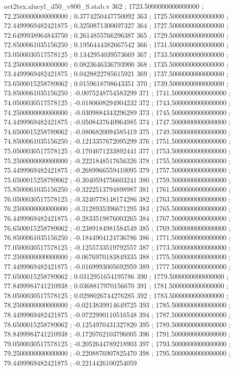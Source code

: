 \begin{filecontents}[overwrite]{oct2tex.alucyl_d50_v800_S.stab.v}
362 ; 1723.5000000000000000 ; 72.2500000000000000 ; 0.3774250447750092
363 ; 1725.5000000000000000 ; 72.4499969482421875 ; 0.3250871300697327
364 ; 1727.5000000000000000 ; 72.6499938964843750 ; 0.2614855766296387
365 ; 1729.5000000000000000 ; 72.8500061035156250 ; 0.1956444382667542
366 ; 1731.5000000000000000 ; 73.0500030517578125 ; 0.1342954039573669
367 ; 1733.5000000000000000 ; 73.2500000000000000 ; 0.0823646336793900
368 ; 1735.5000000000000000 ; 73.4499969482421875 ; 0.0428822785615921
369 ; 1737.5000000000000000 ; 73.6500015258789062 ; 0.0159618798643351
370 ; 1739.5000000000000000 ; 73.8500061035156250 ; -0.0075248754583299
371 ; 1741.5000000000000000 ; 74.0500030517578125 ; -0.0180608294904232
372 ; 1743.5000000000000000 ; 74.2500000000000000 ; -0.0309884343296289
373 ; 1745.5000000000000000 ; 74.4499969482421875 ; -0.0508437640964985
374 ; 1747.5000000000000000 ; 74.6500015258789062 ; -0.0806820094585419
375 ; 1749.5000000000000000 ; 74.8500061035156250 ; -0.1213357672095299
376 ; 1751.5000000000000000 ; 75.0500030517578125 ; -0.1704671233892441
377 ; 1753.5000000000000000 ; 75.2500000000000000 ; -0.2221848517656326
378 ; 1755.5000000000000000 ; 75.4499969482421875 ; -0.2689966559410095
379 ; 1757.5000000000000000 ; 75.6500015258789062 ; -0.3040594756603241
380 ; 1759.5000000000000000 ; 75.8500061035156250 ; -0.3222513794898987
381 ; 1761.5000000000000000 ; 76.0500030517578125 ; -0.3240778148174286
382 ; 1763.5000000000000000 ; 76.2500000000000000 ; -0.3128935396671295
383 ; 1765.5000000000000000 ; 76.4499969482421875 ; -0.2833519876003265
384 ; 1767.5000000000000000 ; 76.6500015258789062 ; -0.2389184981584549
385 ; 1769.5000000000000000 ; 76.8500061035156250 ; -0.1844904124736786
386 ; 1771.5000000000000000 ; 77.0500030517578125 ; -0.1255733519792557
387 ; 1773.5000000000000000 ; 77.2500000000000000 ; -0.0676970183849335
388 ; 1775.5000000000000000 ; 77.4499969482421875 ; -0.0169993005692959
389 ; 1777.5000000000000000 ; 77.6500015258789062 ; 0.0312951654195786
390 ; 1779.5000000000000000 ; 77.8499984741210938 ; 0.0368817970156670
391 ; 1781.5000000000000000 ; 78.0500030517578125 ; 0.0298026744276285
392 ; 1783.5000000000000000 ; 78.2500000000000000 ; -0.0213839914649725
393 ; 1785.5000000000000000 ; 78.4499969482421875 ; -0.0722990110516548
394 ; 1787.5000000000000000 ; 78.6500015258789062 ; -0.1254970431327820
395 ; 1789.5000000000000000 ; 78.8499984741210938 ; -0.1720762103796005
396 ; 1791.5000000000000000 ; 79.0500030517578125 ; -0.2052644789218903
397 ; 1793.5000000000000000 ; 79.2500000000000000 ; -0.2208876907825470
398 ; 1795.5000000000000000 ; 79.4499969482421875 ; -0.2214426100254059

\end{filecontents}
